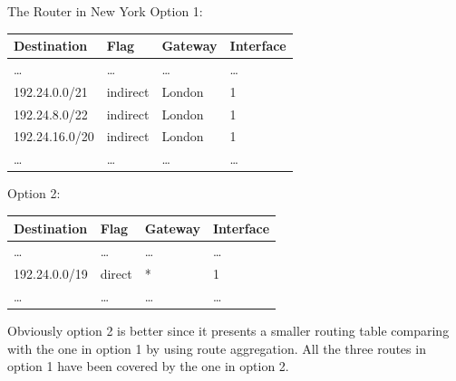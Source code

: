 \begin{frame}
  \begin{block}{The Router in New York}
    Option 1:
    \begin{center}{\ttfamily
        \begin{tabular}{llll}
          \toprule
          Destination&Flag&Gateway&Interface\\\midrule
          \ldots&\ldots&\ldots&\ldots\\
          192.24.0.0/21&indirect&London&1\\
          192.24.8.0/22&indirect&London&1\\
          192.24.16.0/20&indirect&London&1\\
          \ldots&\ldots&\ldots&\ldots\\\bottomrule
        \end{tabular}}
    \end{center}
    Option 2:
    \begin{center}{\ttfamily
        \begin{tabular}{llll}
          \toprule
          Destination&Flag&Gateway&Interface\\\midrule
          \ldots&\ldots&\ldots&\ldots\\
          192.24.0.0/19&direct&*&1\\
          \ldots&\ldots&\ldots&\ldots\\\bottomrule
        \end{tabular}}
    \end{center}
  \end{block}
\end{frame}

Obviously option 2 is better since it presents a smaller routing table comparing with the
one in option 1 by using route aggregation. All the three routes in option 1 have been
covered by the one in option 2.

